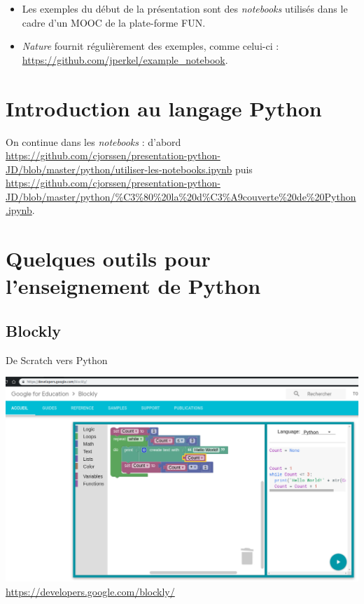 \documentclass[10pt,aspectratio=169]{beamer}
\begin{document}
\begin{frame}
  \begin{itemize}
  \item Les exemples du début de la présentation sont des \emph{notebooks} utilisés dans le cadre d'un MOOC de la plate-forme FUN.
  \item \emph{Nature} fournit régulièrement des exemples, comme celui-ci : \url{https://github.com/jperkel/example_notebook}.
  \end{itemize}
\end{frame}

\section{Introduction au langage Python}

\begin{frame}[fragile]
  On continue dans les \emph{notebooks} : d'abord \url{https://github.com/cjorssen/presentation-python-JD/blob/master/python/utiliser-les-notebooks.ipynb} puis \url{https://github.com/cjorssen/presentation-python-JD/blob/master/python/%C3%80%20la%20d%C3%A9couverte%20de%20Python.ipynb}.
\end{frame}

\section{Quelques outils pour l'enseignement de Python}

\subsection{Blockly}

\begin{frame}{De Scratch vers Python}
  \begin{center}
    \includegraphics[height = .6\textheight]{blockly}
    \url{https://developers.google.com/blockly/}
  \end{center}
\end{frame}
\end{document}
